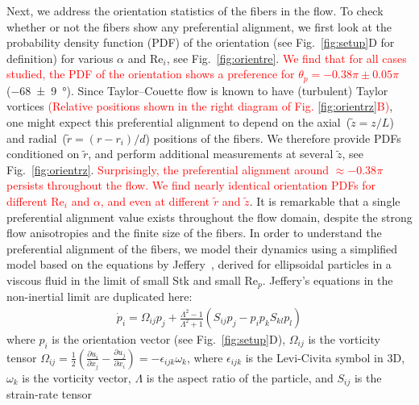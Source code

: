 \documentclass[aps, pre, onecolumn, superscriptaddress,longbibliography]{revtex4-1}
\newcommand{\makered}[1]{\textcolor{red}{#1}}
\begin{document}
\indent Next, we address the orientation statistics of the fibers in the flow.
To check whether or not the fibers show any preferential alignment, we first
look at the probability density function (PDF) of the orientation (see
Fig.~\ref{fig:setup}D for definition) for various $\alpha$ and
$\text{Re}_i$, see Fig.~\ref{fig:orientre}. \makered{We find that for all cases studied, the PDF of the orientation shows a preference for
$\theta_p = -0.38\pi \pm 0.05\pi$} (\SI[separate-uncertainty =
true,multi-part-units=single]{-68(9)}{\degree}). Since Taylor--Couette flow
\cite{Grossmann2016} is known to have (turbulent) Taylor vortices \cite{Huisman2014, vanderVeen2016}
\makered{(Relative positions shown in the right diagram of Fig. \ref{fig:orientrz}B)}, one might expect this preferential alignment to depend on
the axial~($\tilde{z}=z/L$) and radial~($\tilde{r}=(r-r_i)/d$) positions of
the fibers. We therefore provide PDFs conditioned on $\tilde{r}$, and perform
additional measurements at several $\tilde{z}$, see Fig.~\ref{fig:orientrz}.
\makered{Surprisingly, the preferential alignment around $\approx -0.38\pi$
persists throughout the flow. We find nearly identical orientation PDFs for
different $\text{Re}_i$ and $\alpha$, and even at different $\tilde{r}$ and
$\tilde{z}$}.
It is remarkable that a single preferential alignment value exists throughout the flow domain, despite 
the strong flow anisotropies and the finite size of the fibers.
%
\indent In order to understand the preferential alignment of the fibers, we
model their dynamics using a simplified model based on the equations by Jeffery~\cite{Jeffery1922}, derived for ellipsoidal particles in
a viscous fluid in the limit of small Stk and small $\text{Re}_p$. Jeffery's
equations in the non-inertial limit are duplicated here:
\begin{align}
\dot{p}_i = \Omega_{ij} p_j + \frac{\Lambda^2 - 1}{\Lambda^2 + 1} \left(
S_{ij}p_j - p_i p_k S_{kl} p_l \right) \label{eq:jeff}
\end{align}
where $p_i$ is the orientation vector (see Fig.~\ref{fig:setup}D),
$\Omega_{ij}$ is the vorticity tensor
$\Omega_{ij}= \frac 12 \left(\frac{\partial u_i}{\partial x_j} - \frac{\partial u_j}{\partial x_i} \right) = -\epsilon_{ijk}\omega_k$,
where $\epsilon_{ijk}$ is the Levi-Civita symbol
in 3D, $\omega_k$ is the vorticity vector, $\Lambda$ is the aspect ratio of
the particle, and $S_{ij}$ is the strain-rate tensor 
\end{document}
